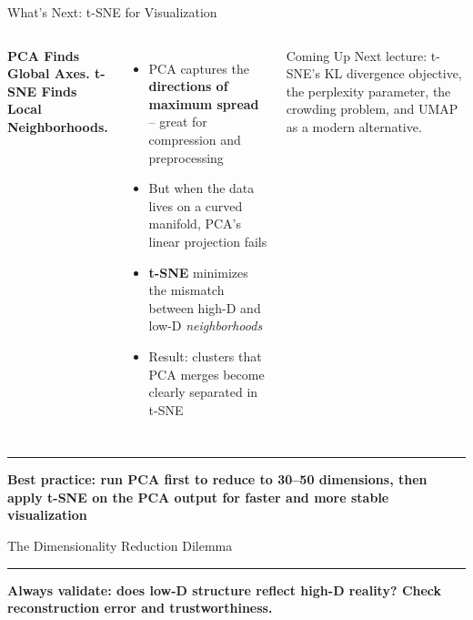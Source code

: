 \documentclass[8pt,aspectratio=169]{beamer}
\newcommand{\bottomnote}[1]{%
\vfill
\vspace{-2mm}
\textcolor{mllavender2}{\rule{\textwidth}{0.4pt}}
\vspace{1mm}
\footnotesize
\textbf{#1}
}
\newenvironment{compactlist}{%
  \begin{itemize}%
    \setlength{\itemsep}{2pt}%
    \setlength{\parskip}{0pt}%
    \setlength{\parsep}{0pt}%
}{%
  \end{itemize}%
}
\newcommand{\highlight}[1]{\textcolor{mlorange}{\textbf{#1}}}
\begin{document}
\begin{frame}[t]{What's Next: t-SNE for Visualization}
\begin{columns}[T]
\small
\textbf{PCA Finds Global Axes. t-SNE Finds Local Neighborhoods.}

\vspace{3mm}
\begin{compactlist}
\item PCA captures the \highlight{directions of maximum spread} -- great for compression and preprocessing
\item But when the data lives on a curved manifold, PCA's linear projection fails
\item \highlight{t-SNE} minimizes the mismatch between high-D and low-D \emph{neighborhoods}
\item Result: clusters that PCA merges become clearly separated in t-SNE
\end{compactlist}

\vspace{3mm}
\begin{block}{Coming Up}
\scriptsize Next lecture: t-SNE's KL divergence objective, the perplexity parameter, the crowding problem, and UMAP as a modern alternative.
\end{block}
\end{columns}

\bottomnote{Best practice: run PCA first to reduce to 30--50 dimensions, then apply t-SNE on the PCA output for faster and more stable visualization}
\end{frame}

\begin{frame}[t]{The Dimensionality Reduction Dilemma}
\begin{center}
\end{center}

\bottomnote{Always validate: does low-D structure reflect high-D reality? Check reconstruction error and trustworthiness.}
\end{frame}
\end{document}
